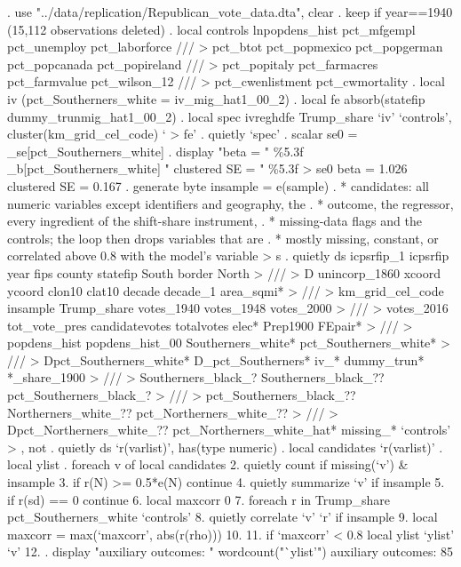 . use "../data/replication/Republican_vote_data.dta", clear
{\smallskip}
. keep if year==1940
(15,112 observations deleted)
{\smallskip}
. local controls lnpopdens_hist pct_mfgempl pct_unemploy pct_laborforce ///
>     pct_btot pct_popmexico pct_popgerman pct_popcanada pct_popireland ///
>     pct_popitaly pct_farmacres pct_farmvalue pct_wilson_12 ///
>     pct_cwenlistment pct_cwmortality
{\smallskip}
. local iv (pct_Southerners_white = iv_mig_hat1_00_2)
{\smallskip}
. local fe absorb(statefip dummy_trunmig_hat1_00_2)
{\smallskip}
. local spec ivreghdfe Trump_share `iv' `controls', cluster(km_grid_cel_code) `
> fe'
{\smallskip}
. quietly `spec'
{\smallskip}
. scalar se0 = _se[pct_Southerners_white]
{\smallskip}
. display "beta = " \%5.3f _b[pct_Southerners_white] "   clustered SE = " \%5.3f 
> se0
beta = 1.026   clustered SE = 0.167
{\smallskip}
. generate byte insample = e(sample)
{\smallskip}
. * candidates: all numeric variables except identifiers and geography, the
. * outcome, the regressor, every ingredient of the shift-share instrument,
. * missing-data flags and the controls; the loop then drops variables that are
. * mostly missing, constant, or correlated above 0.8 with the model's variable
> s
. quietly ds icpsrfip_1 icpsrfip year fips county statefip South border North  
> ///
>     D unincorp_1860 xcoord ycoord clon10 clat10 decade decade_1 area_sqmi*   
>  ///
>     km_grid_cel_code insample Trump_share votes_1940 votes_1948 votes_2000   
>  ///
>     votes_2016 tot_vote_pres candidatevotes totalvotes elec* Prep1900 FEpair*
>  ///
>     popdens_hist popdens_hist_00 Southerners_white* pct_Southerners_white*   
> ///
>     Dpct_Southerners_white* D_pct_Southerners* iv_* dummy_trun* *_share_1900 
> ///
>     Southerners_black_? Southerners_black_?? pct_Southerners_black_?         
>  ///
>     pct_Southerners_black_?? Northerners_white_?? pct_Northerners_white_??   
>  ///
>     Dpct_Northerners_white_?? pct_Northerners_white_hat* missing_* `controls'
> , not
{\smallskip}
. quietly ds `r(varlist)', has(type numeric)
{\smallskip}
. local candidates `r(varlist)'
{\smallskip}
. local ylist
{\smallskip}
. foreach v of local candidates {\lbr}
  2.     quietly count if missing(`v') \& insample
  3.     if r(N) >= 0.5*e(N) continue
  4.     quietly summarize `v' if insample
  5.     if r(sd) == 0 continue
  6.     local maxcorr 0
  7.     foreach r in Trump_share pct_Southerners_white `controls' {\lbr}
  8.         quietly correlate `v' `r' if insample
  9.         local maxcorr = max(`maxcorr', abs(r(rho)))
 10.     {\rbr}
 11.     if `maxcorr' < 0.8 local ylist `ylist' `v'
 12. {\rbr}
{\smallskip}
. display "auxiliary outcomes: " wordcount("`ylist'")
auxiliary outcomes: 85
{\smallskip}
